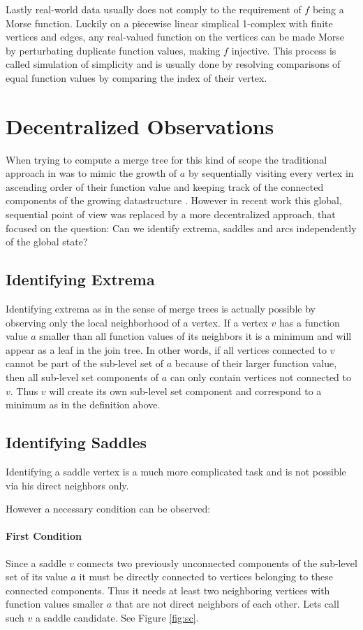 \documentclass[%
	paper=A4,					%
	twoside=true,				%
	openright,					%
	parskip=full,				%
	chapterprefix=true,			%
	11pt,						%
	headings=normal,			%
	bibliography=totoc,			%
	listof=totoc,				%
	titlepage=on,				%
	captions=tableabove,		%
	draft=false,				%
]{scrreprt}%
\begin{document}
Lastly real-world data usually does not comply to the requirement of \(f\) being a Morse function. Luckily on a piecewise linear simplical 1-complex with finite vertices and edges, any real-valued function on the vertices can be made Morse by perturbating duplicate function values, making \(f\) injective. This process is called simulation of simplicity and is usually done by resolving comparisons of equal function values by comparing the index of their vertex.

\section{Decentralized Observations}
When trying to compute a merge tree for this kind of scope the traditional approach in \cite{orig} was to mimic the growth of \(a\) by sequentially visiting every vertex in ascending order of their function value and keeping track of the connected components of the growing datastructure \cite{pascucci1}. However in recent work this global, sequential point of view was replaced by a more decentralized approach, that focused on the question: Can we identify extrema, saddles and arcs independently of the global state? 

\subsection{Identifying Extrema}
Identifying extrema as in the sense of merge trees is actually possible by observing only the local neighborhood of a vertex. If a vertex \(v\) has a function value \(a\) smaller than all function values of its neighbors it is a minimum and will appear as a leaf in the join tree. In other words, if all vertices connected to \(v\) cannot be part of the sub-level set of \(a\) because of their larger function value, then all sub-level set components of \(a\) can only contain vertices not connected to \(v\). Thus \(v\) will create its own sub-level set component and correspond to a minimum as in the definition above.

\subsection{Identifying Saddles}
Identifying a saddle vertex is a much more complicated task and is not possible via his direct neighbors only. 

However a necessary condition can be observed: 

\paragraph{First Condition} Since a saddle \(v\) connects two previously unconnected components of the sub-level set of its value \(a\) it must be directly connected to vertices belonging to these connected components. Thus it needs at least two neighboring vertices with function values smaller \(a\) that are not direct neighbors of each other. Lets call such \(v\) a saddle candidate. See Figure \ref{fig:sc}.
\end{document}
